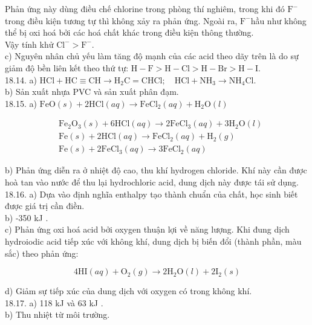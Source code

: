 \documentclass[10pt]{article}
\begin{document}
Phản ứng này dùng điều chế chlorine trong phòng thí nghiêm, trong khi đó $\mathrm{F}^{-}$trong điều kiện tương tự thì không xảy ra phản ứng. Ngoài ra, $\mathrm{F}^{-}$hầu như không thể bị oxi hoá bởi các hoá chất khác trong điều kiện thông thường.\\
Vậy tính khử $\mathrm{Cl}^{-}>\mathrm{F}^{-}$.\\
c) Nguyên nhân chủ yếu làm tăng độ mạnh của các acid theo dãy trên là do sự giảm độ bền liên kết theo thứ tự: $\mathrm{H}-\mathrm{F}>\mathrm{H}-\mathrm{Cl}>\mathrm{H}-\mathrm{Br}>\mathrm{H}-\mathrm{I}$.\\
18.14. a) $\mathrm{HCl}+\mathrm{HC} \equiv \mathrm{CH} \rightarrow \mathrm{H}_{2} \mathrm{C}=\mathrm{CHCl} ; \quad \mathrm{HCl}+\mathrm{NH}_{3} \rightarrow \mathrm{NH}_{4} \mathrm{Cl}$.\\
b) Sản xuất nhựa PVC và sản xuất phân đạm.\\
18.15. a) $\mathrm{FeO}(s)+2 \mathrm{HCl}(a q) \rightarrow \mathrm{FeCl}_{2}(a q)+\mathrm{H}_{2} \mathrm{O}(l)$

$$
\begin{aligned}
& \mathrm{Fe}_{2} \mathrm{O}_{3}(s)+6 \mathrm{HCl}(a q) \rightarrow 2 \mathrm{FeCl}_{3}(a q)+3 \mathrm{H}_{2} \mathrm{O}(l) \\
& \mathrm{Fe}(s)+2 \mathrm{HCl}(a q) \rightarrow \mathrm{FeCl}_{2}(a q)+\mathrm{H}_{2}(g) \\
& \mathrm{Fe}(s)+2 \mathrm{FeCl}_{3}(a q) \rightarrow 3 \mathrm{FeCl}_{2}(a q)
\end{aligned}
$$

b) Phản ứng diễn ra ở nhiệt độ cao, thu khí hydrogen chloride. Khí này cần được hoà tan vào nước để thu lại hydrochloric acid, dung dịch này được tái sử dụng.\\
18.16. a) Dựa vào định nghĩa enthalpy tạo thành chuẩn của chất, học sinh biết được giá trị cần điền.\\
b) -350 kJ .\\
c) Phản ứng oxi hoá acid bởi oxygen thuận lợi về năng lượng. Khi đung dịch hydroiodic acid tiếp xúc với không khí, dung dịch bị biến đổi (thành phần, màu sắc) theo phản ứng:

$$
4 \mathrm{HI}(a q)+\mathrm{O}_{2}(g) \rightarrow 2 \mathrm{H}_{2} \mathrm{O}(l)+2 \mathrm{I}_{2}(s)
$$

d) Giảm sự tiếp xúc của dung dịch với oxygen có trong không khí.\\
18.17. a) 118 kJ và 63 kJ .\\
b) Thu nhiệt từ môi trường.
\end{document}
